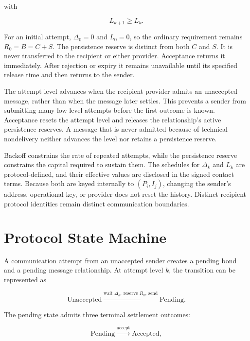 \documentclass[11pt]{article}
\begin{document}
with

\begin{equation}
L_{k+1}\geq L_k.
\end{equation}

For an initial attempt, $\Delta_0=0$ and $L_0=0$, so the ordinary requirement remains $R_0=B=C+S$. The persistence reserve is distinct from both $C$ and $S$. It is never transferred to the recipient or either provider. Acceptance returns it immediately. After rejection or expiry it remains unavailable until its specified release time and then returns to the sender.

The attempt level advances when the recipient provider admits an unaccepted message, rather than when the message later settles. This prevents a sender from submitting many low-level attempts before the first outcome is known. Acceptance resets the attempt level and releases the relationship's active persistence reserves. A message that is never admitted because of technical nondelivery neither advances the level nor retains a persistence reserve.

Backoff constrains the rate of repeated attempts, while the persistence reserve constrains the capital required to sustain them. The schedules for $\Delta_k$ and $L_k$ are protocol-defined, and their effective values are disclosed in the signed contact terms. Because both are keyed internally to $(P_i,I_j)$, changing the sender's address, operational key, or provider does not reset the history. Distinct recipient protocol identities remain distinct communication boundaries.

\section{Protocol State Machine}

A communication attempt from an unaccepted sender creates a pending bond and a pending message relationship. At attempt level $k$, the transition can be represented as

\begin{equation}
\text{Unaccepted}
\xrightarrow{\text{wait }\Delta_k,\ \text{reserve }R_k,\ \text{send}}
\text{Pending}.
\end{equation}

The pending state admits three terminal settlement outcomes:

\begin{equation}
\text{Pending}
\xrightarrow{\text{accept}}
\text{Accepted},
\end{equation}
\end{document}
